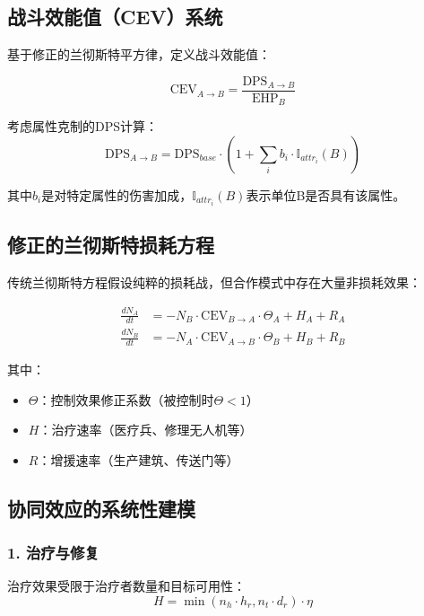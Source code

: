 \documentclass[a4paper,12pt]{article}
\begin{document}
\subsection{战斗效能值（CEV）系统}
基于修正的兰彻斯特平方律，定义战斗效能值：

\begin{equation}
\text{CEV}_{A \rightarrow B} = \frac{\text{DPS}_{A \rightarrow B}}{\text{EHP}_B}
\end{equation}

考虑属性克制的DPS计算：
\begin{equation}
\text{DPS}_{A \rightarrow B} = \text{DPS}_{base} \cdot (1 + \sum_i b_i \cdot \mathbb{I}_{attr_i}(B))
\end{equation}

其中$b_i$是对特定属性的伤害加成，$\mathbb{I}_{attr_i}(B)$表示单位B是否具有该属性。

\subsection{修正的兰彻斯特损耗方程}
传统兰彻斯特方程假设纯粹的损耗战，但合作模式中存在大量非损耗效果：

\begin{align}
\frac{dN_A}{dt} &= -N_B \cdot \text{CEV}_{B \rightarrow A} \cdot \Theta_A + H_A + R_A \\
\frac{dN_B}{dt} &= -N_A \cdot \text{CEV}_{A \rightarrow B} \cdot \Theta_B + H_B + R_B
\end{align}

其中：
\begin{itemize}
\item $\Theta$：控制效果修正系数（被控制时$\Theta < 1$）
\item $H$：治疗速率（医疗兵、修理无人机等）
\item $R$：增援速率（生产建筑、传送门等）
\end{itemize}

\subsection{协同效应的系统性建模}

\subsubsection{1. 治疗与修复}
治疗效果受限于治疗者数量和目标可用性：
\begin{equation}
H = \min(n_h \cdot h_r, n_t \cdot d_r) \cdot \eta
\end{equation}
\end{document}
